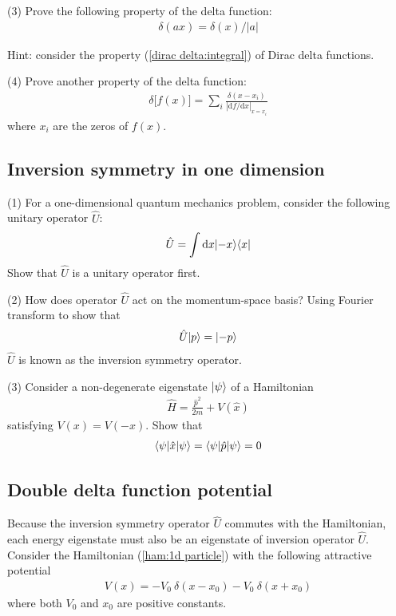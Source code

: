 (3) Prove the following property of the delta function:
\begin{align}
\delta(ax)=\delta(x)/|a|
\end{align}

Hint: consider the property (\ref{dirac delta:integral}) of Dirac delta functions.  

(4) Prove another property of the delta function:
\begin{align}
\delta\big[f(x)\big]=\sum_i\frac{\delta(x-x_i)}{|\text{d}f/\text{d}x|_{x=x_i}}
\end{align}
where $x_i$ are the zeros of $f(x)$.



\subsection{Inversion symmetry in one dimension}

(1) For a one-dimensional quantum mechanics problem, consider the following unitary operator $\hat U$:
\begin{align}
\hat U=\int\text{d}x|{-x}\rangle\langle{x}|
\end{align}
Show that $\hat U$ is a unitary operator first. 

(2) How does operator $\hat U$ act on the momentum-space basis? Using Fourier transform to show that
\begin{align}
\hat U|{p}\rangle=|{-p}\rangle
\end{align}
$\hat U$ is known as the inversion symmetry operator. 

(3) Consider a non-degenerate eigenstate $|{\psi}\rangle$ of a Hamiltonian
\begin{align}\label{ham:1d particle}
\hat H=\frac{\hat p^2}{2m}+V(\hat x)
\end{align}
satisfying $V(x)=V(-x)$. Show that 
\begin{align}
\langle{\psi|\hat x|\psi}\rangle=\langle{\psi|\hat p|\psi}\rangle=0
\end{align}

\subsection{Double delta function potential}

Because the inversion symmetry operator $\hat U$ commutes with the Hamiltonian, each energy eigenstate must also be an eigenstate of inversion operator $\hat U$. Consider the Hamiltonian (\ref{ham:1d particle}) with the following attractive potential
\begin{align}
V(x)=-V_0~\delta(x-x_0)-V_0~\delta(x+x_0)
\end{align}
where both $V_0$ and $x_0$ are positive constants. 


